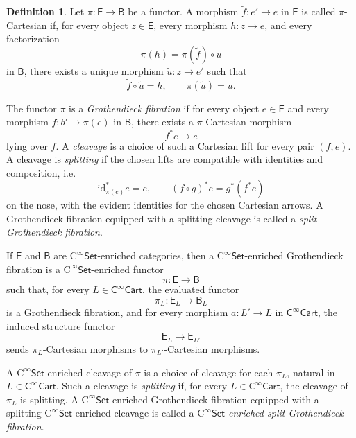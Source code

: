 \documentclass{amsart}
\newcommand{\cat}[1]{\mathsf{#1}}
\newcommand{\Set}{\cat{Set}}
\newcommand{\id}{\mathrm{id}}
\newcommand{\Cart}{\cat{C}^{\infty}\cat{Cart}}
\theoremstyle{definition}
\newtheorem{definition}[equation]{Definition}
\numberwithin{equation}{subsection}
\numberwithin{subsubsection}{subsection}
\begin{document}
\begin{definition}\label{def:split.grothendieck.fibration}
  Let \( \pi:\cat{E}\to \cat{B} \) be a functor. A morphism
  \( \widetilde{f}:e'\to e \) in \( \cat{E} \) is called
  \( \pi \)-Cartesian if, for every object \( z\in\cat{E} \), every
  morphism \( h:z\to e \), and every factorization
  \[
    \pi(h)=\pi(\widetilde{f})\circ u
  \]
  in \( \cat{B} \), there exists a unique morphism
  \( \widetilde{u}:z\to e' \) such that
  \[
    \widetilde{f}\circ \widetilde{u}=h,
    \qquad
    \pi(\widetilde{u})=u.
  \]

  The functor \( \pi \) is a \emph{Grothendieck fibration} if for every
  object \( e\in\cat{E} \) and every morphism
  \( f:b'\to \pi(e) \) in \( \cat{B} \), there exists a
  \( \pi \)-Cartesian morphism
  \[
    f^{*}e\longrightarrow e
  \]
  lying over \( f \).  A \emph{cleavage} is a choice of such a Cartesian
  lift for every pair \( (f,e) \).  A cleavage is \emph{splitting} if the
  chosen lifts are compatible with identities and composition, i.e.
  \[
    \id_{\pi(e)}^{*}e=e,
    \qquad
    (f\circ g)^{*}e=g^{*}(f^{*}e)
  \]
  on the nose, with the evident identities for the chosen Cartesian
  arrows.  A Grothendieck fibration equipped with a splitting cleavage is
  called a \emph{split Grothendieck fibration}.

  If \( \cat{E} \) and \( \cat{B} \) are \( \mathrm{C}^{\infty}\Set \)-enriched
  categories, then a \( \mathrm{C}^{\infty}\Set \)-enriched Grothendieck
  fibration is a \( \mathrm{C}^{\infty}\Set \)-enriched functor
  \[
    \pi:\cat{E}\to\cat{B}
  \]
  such that, for every \( L\in\Cart \), the evaluated functor
  \[
    \pi_L:\cat{E}_L\to\cat{B}_L
  \]
  is a Grothendieck fibration, and for every morphism
  \( a:L'\to L \) in \( \Cart \), the induced structure functor
  \[
    \cat{E}_L\longrightarrow \cat{E}_{L'}
  \]
  sends \( \pi_L \)-Cartesian morphisms to \( \pi_{L'} \)-Cartesian
  morphisms.

  A \( \mathrm{C}^{\infty}\Set \)-enriched cleavage of \( \pi \) is a choice
  of cleavage for each \( \pi_L \), natural in \( L\in\Cart \).  Such a
  cleavage is \emph{splitting} if, for every \( L\in\Cart \), the cleavage of
  \( \pi_L \) is splitting.  A \( \mathrm{C}^{\infty}\Set \)-enriched
  Grothendieck fibration equipped with a splitting
  \( \mathrm{C}^{\infty}\Set \)-enriched cleavage is called a
  \emph{\( \mathrm{C}^{\infty}\Set \)-enriched split Grothendieck fibration}.
\end{definition}
\end{document}
